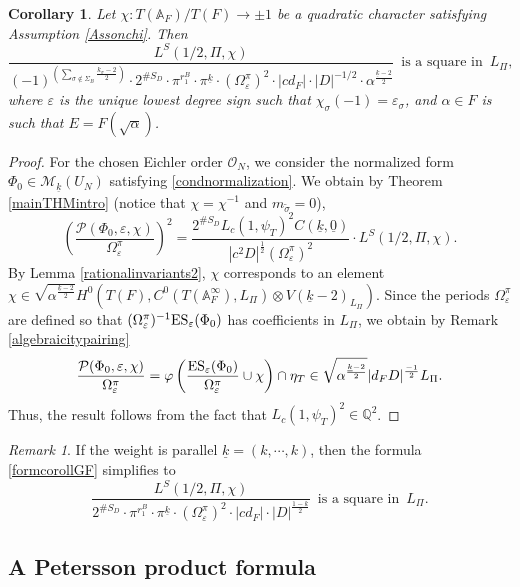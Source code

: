 \documentclass{amsart}
\newtheorem{corollary}[theorem]{Corollary}
\theoremstyle{definition}
\theoremstyle{remark}
\newtheorem{remark}[theorem]{Remark}
\numberwithin{equation}{section}
\newcommand{\A}{{\mathbb A}}
\newcommand{\Q}{{\mathbb Q}}
\newcommand{\cM}{{\mathcal M}}
\newcommand{\cP}{{\mathcal P}}
\newcommand{\cO}{{\mathcal O}}
\begin{document}
\begin{corollary}\label{AlgebraicityofL}
    Let $\chi:T(\A_F)/T(F)\rightarrow\pm 1$ be a quadratic character satisfying Assumption \ref{Assonchi}. Then 
    \begin{equation}\label{formcorollGF}
\frac{L^S(1/2,\Pi,\chi)}{(-1)^{\left(\sum_{\sigma\not\in\Sigma_B}\frac{k_\sigma-2}{2}\right)}\cdot 2^{\#S_D}\cdot\pi^{r_1^B}\cdot\pi^{\underline k}\cdot(\Omega^\pi_\varepsilon)^{2}\cdot|cd_F|\cdot| D|^{-1/2} \cdot \alpha^{\frac{\underline{k}-2}{2}}}\,\text{ is a square in }\, L_\Pi,  
\end{equation}
where $\varepsilon$ is the unique lowest degree sign such that $\chi_{\sigma}(-1)=\varepsilon_\sigma$, and $\alpha\in F$ is such that $E=F(\sqrt{\alpha})$.
\end{corollary}
\begin{proof}
For the chosen Eichler order $\cO_N$, we consider the normalized form $\Phi_0\in \cM_{\underline k}(U_N)$ satisfying \eqref{condnormalization}. We obtain by Theorem \ref{mainTHMintro} (notice that $\chi=\chi^{-1}$ and $m_{\tilde\sigma}=0$),
\[
\left(\frac{\cP(\Phi_0,\varepsilon,\chi)}{\Omega^\pi_\varepsilon}\right)^2=\frac{2^{\#S_D}L_{c}(1,\psi_{T})^2
C(\underline k,\underline 0)}{|c^2 D|^{\frac{1}{2}}(\Omega^\pi_\varepsilon)^2}\cdot L^S(1/2,\Pi,\chi).
\]
By Lemma \ref{rationalinvariants2}, $\chi$ corresponds to an element $\chi\in \sqrt{\alpha^{\frac{\underline{k}-2}{2}}}H^0(T(F),C^0(T(\A_F^\infty),L_\Pi)\otimes V(\underline{k}-2)_{L_\Pi})$.
Since the periods $\Omega^\pi_\varepsilon$ are defined so that $(\Omega^\pi_\varepsilon)^{-1}{\rm ES}_\varepsilon(\Phi_0)$ has coefficients in $L_\Pi$, we obtain by Remark \ref{algebraicitypairing}
\[
\frac{\cP(\Phi_0,\varepsilon,\chi)}{\Omega^\pi_\varepsilon}=\varphi\left(\frac{{\rm ES}_\varepsilon(\Phi_0)}{\Omega^\pi_\varepsilon}\cup\chi\right)\cap\eta_T\in \sqrt{\alpha^{\frac{\underline{k}-2}{2}}}|d_FD|^{\frac{-1}{2}}L_\Pi.
\]
Thus, the result follows from the fact that $L_{c}(1,\psi_{T})^2\in\Q^2$.
\end{proof}
\begin{remark}
    If the weight is parallel $\underline k=(k,\cdots,k)$, then the formula \eqref{formcorollGF} simplifies to
    \[
    \frac{L^S(1/2,\Pi,\chi)}{2^{\#S_D}\cdot\pi^{r_1^B}\cdot\pi^{\underline k}\cdot(\Omega^\pi_\varepsilon)^{2}\cdot|cd_F| \cdot |D|^{\frac{1-k}{2}}}\,\text{ is a square in }\, L_\Pi.
    \]
\end{remark}

\subsection{A Petersson product formula}
\end{document}
